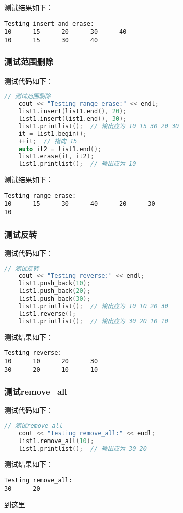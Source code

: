\documentclass[fontset=fandol]{ctexart}
\begin{document}
测试结果如下：
\begin{verbatim}  
Testing insert and erase:
10      15      20      30      40
10      15      30      40
\end{verbatim}

\subsubsection{测试范围删除}
测试代码如下：
\begin{lstlisting}[language=C++, caption={测试范围删除}]  
// 测试范围删除  
    cout << "Testing range erase:" << endl;  
    list1.insert(list1.end(), 20);  
    list1.insert(list1.end(), 30);  
    list1.printlist();  // 输出应为 10 15 30 20 30  
    it = list1.begin();  
    ++it;  // 指向 15  
    auto it2 = list1.end();    
    list1.erase(it, it2);  
    list1.printlist();  // 输出应为 10
\end{lstlisting}

测试结果如下：
\begin{verbatim}  
Testing range erase:
10      15      30      40      20      30
10
\end{verbatim}

\subsubsection{测试反转}
测试代码如下：
\begin{lstlisting}[language=C++, caption={测试反转}]  
// 测试反转  
    cout << "Testing reverse:" << endl;  
    list1.push_back(10);  
    list1.push_back(20);  
    list1.push_back(30);  
    list1.printlist();  // 输出应为 10 10 20 30  
    list1.reverse();  
    list1.printlist();  // 输出应为 30 20 10 10
\end{lstlisting}

测试结果如下：
\begin{verbatim}  
Testing reverse:
10      10      20      30
30      20      10      10
\end{verbatim}

\subsubsection{测试remove\_all}
测试代码如下：
\begin{lstlisting}[language=C++, caption={测试remove\_all}]  
// 测试remove_all  
    cout << "Testing remove_all:" << endl;  
    list1.remove_all(10);  
    list1.printlist();  // 输出应为 30 20
\end{lstlisting}

测试结果如下：
\begin{verbatim}  
Testing remove_all:
30      20
\end{verbatim}

到这里
\end{document}
